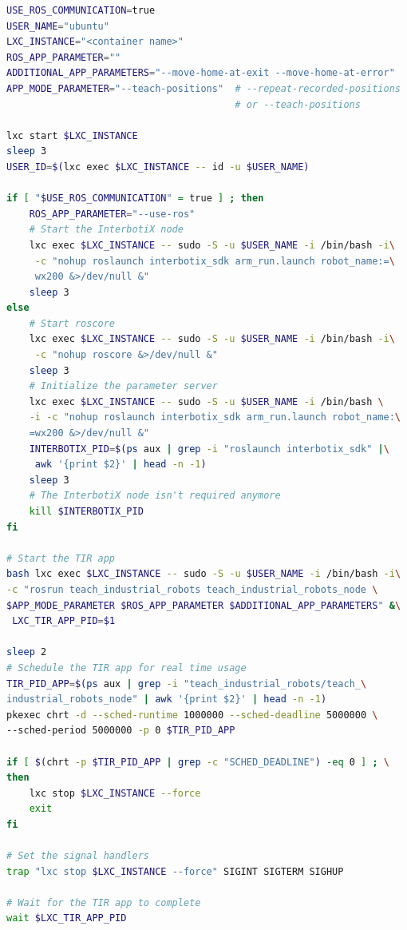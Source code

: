 \begin{lstlisting}[language=bash, caption={Script zum Starten der Roboter-Gesten-Anwendung}, label={lst:start_script_for_app}]
USE_ROS_COMMUNICATION=true
USER_NAME="ubuntu"
LXC_INSTANCE="<container name>"
ROS_APP_PARAMETER=""
ADDITIONAL_APP_PARAMETERS="--move-home-at-exit --move-home-at-error"
APP_MODE_PARAMETER="--teach-positions"  # --repeat-recorded-positions
                                        # or --teach-positions

lxc start $LXC_INSTANCE
sleep 3
USER_ID=$(lxc exec $LXC_INSTANCE -- id -u $USER_NAME)

if [ "$USE_ROS_COMMUNICATION" = true ] ; then
    ROS_APP_PARAMETER="--use-ros"
    # Start the InterbotiX node
    lxc exec $LXC_INSTANCE -- sudo -S -u $USER_NAME -i /bin/bash -i\
     -c "nohup roslaunch interbotix_sdk arm_run.launch robot_name:=\
     wx200 &>/dev/null &"
    sleep 3
else
    # Start roscore
    lxc exec $LXC_INSTANCE -- sudo -S -u $USER_NAME -i /bin/bash -i\
     -c "nohup roscore &>/dev/null &"
    sleep 3
    # Initialize the parameter server
    lxc exec $LXC_INSTANCE -- sudo -S -u $USER_NAME -i /bin/bash \
    -i -c "nohup roslaunch interbotix_sdk arm_run.launch robot_name:\
    =wx200 &>/dev/null &"
    INTERBOTIX_PID=$(ps aux | grep -i "roslaunch interbotix_sdk" |\
     awk '{print $2}' | head -n -1)
    sleep 3
    # The InterbotiX node isn't required anymore
    kill $INTERBOTIX_PID
fi

# Start the TIR app
bash lxc exec $LXC_INSTANCE -- sudo -S -u $USER_NAME -i /bin/bash -i\
-c "rosrun teach_industrial_robots teach_industrial_robots_node \
$APP_MODE_PARAMETER $ROS_APP_PARAMETER $ADDITIONAL_APP_PARAMETERS" &\
 LXC_TIR_APP_PID=$1

sleep 2
# Schedule the TIR app for real time usage
TIR_PID_APP=$(ps aux | grep -i "teach_industrial_robots/teach_\
industrial_robots_node" | awk '{print $2}' | head -n -1)
pkexec chrt -d --sched-runtime 1000000 --sched-deadline 5000000 \
--sched-period 5000000 -p 0 $TIR_PID_APP

if [ $(chrt -p $TIR_PID_APP | grep -c "SCHED_DEADLINE") -eq 0 ] ; \
then
    lxc stop $LXC_INSTANCE --force
    exit
fi

# Set the signal handlers
trap "lxc stop $LXC_INSTANCE --force" SIGINT SIGTERM SIGHUP

# Wait for the TIR app to complete
wait $LXC_TIR_APP_PID
\end{lstlisting}



